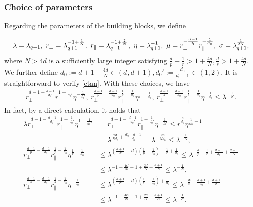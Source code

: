 \documentclass[UTF-8,reqno]{amsart}
\numberwithin{equation}{section}
\theoremstyle{definition}
\def\leq{\leqslant}
\def\leq{\leqslant}
\begin{document}
\subsubsection{Choice of parameters}\label{sec:4choicepara}
Regarding the parameters of the building blocks, we define
  
\begin{align}
  \lambda=\lambda_{q+1},\ r_\perp=\lambda_{q+1}^{-1+\frac1{N}},\ r_\parallel=\lambda_{q+1}^{-1+\frac2{N}},\ \eta=\lambda_{q+1}^{-1},\  \mu=r_\perp^{-\frac{d-1}{d_0}}r_\parallel^{-\frac1{d_0}}, \ \sigma=\lambda_{q+1}^{\frac1{2N}}, \notag
\end{align}
where $N>4d$ is a sufficiently large integer satisfying $\frac{d}{p}+\frac{1}{r}>1+\frac{4d}N,\frac{d}{s}>1+\frac{4d}N$. We further define $d_0:=d+1-\frac{4d}{N}\in(d,d+1), d_0':=\frac{d_0}{d_0-1}\in(1,2)$. It is straightforward to verify \eqref{etan}.
With these choices,  we have
\begin{align}
  r_\perp^{d-1-\frac{d-1}{d_0'}} r_\parallel^{1-\frac{1}{d_0'}}\eta^{-\frac{1}{d_0'}},\    r_\perp^{\frac{d-1}{p}-\frac{d-1}{d_0}} r_\parallel^{\frac{1}{p}-\frac{1}{d_0}}\eta^{\frac1r-\frac1{d_0}}, \  r_\perp^{\frac{d-1}{s}-\frac{d-1}{d_0}} r_\parallel^{\frac{1}{s}-\frac{1}{d_0}}\eta^{-\frac1{d_0}} \leq\lambda^{-\frac1N}.\label{bd:paralam4}
\end{align}
 In fact, by a direct calculation, it holds that
    \begin{align*}
        \lambda r_\perp^{d-1-\frac{d-1}{d_0'}}r_\parallel^{1-\frac{1}{d_0'}}\eta^{1-\frac1{d_0'}}&=r_\perp^{d-1-\frac{d-1}{d_0'}} r_\parallel^{1-\frac{1}{d_0'}}\eta^{-\frac{1}{d_0'}}\leq r_\parallel^{\frac{d}{d_0}}\eta^{\frac{1}{d_0}-1}\\
        &= \lambda^{\frac{2d}{Nd_0}+\frac{d_0-d-1}{d_0}}= \lambda^{-\frac{2d}{Nd_0}}\leq \lambda^{-\frac1N},\\
 r_\perp^{\frac{d-1}{p}-\frac{d-1}{d_0}} r_\parallel^{\frac{1}{p}-\frac{1}{d_0}}\eta^{\frac1r-\frac1{d_0}}&\leq  \lambda^{(\frac{d+1}{N}-d)(\frac{1}{p}-\frac{1}{d_0})-\frac1r+\frac1{d_0}}
 \leq\lambda^{-\frac{d}{p}-\frac1r+\frac{d+1}{d_0}+\frac{d+1}{N}}\\
 &\leq \lambda^{-1-\frac{4d}N+1+\frac{2d}{N}+\frac{d+1}{N}}\leq \lambda^{-\frac1N},\\
  r_\perp^{\frac{d-1}{s}-\frac{d-1}{d_0}} r_\parallel^{\frac{1}{s}-\frac{1}{d_0}}\eta^{-\frac1{d_0}}&\leq  \lambda^{(\frac{d+1}{N}-d)(\frac{1}{s}-\frac{1}{d_0})+\frac1{d_0}}
 \leq\lambda^{-\frac{d}{s}+\frac{d+1}{d_0}+\frac{d+1}{N}}\\
 &\leq \lambda^{-1-\frac{4d}N+1+\frac{2d}{N}+\frac{d+1}{N}}\leq \lambda^{-\frac1N}.
    \end{align*}
 
\end{document}
